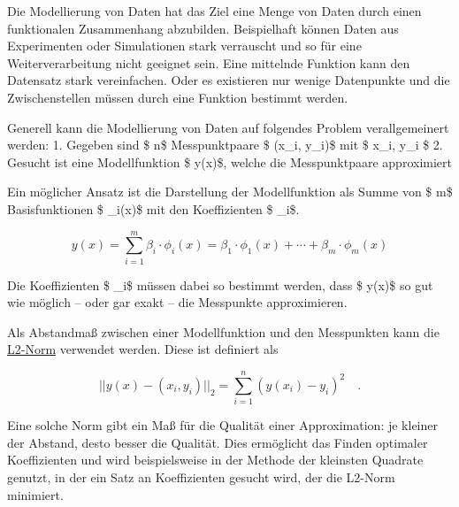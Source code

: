\documentclass[
  letterpaper,
  DIV=11,
  numbers=noendperiod]{scrreprt}
\begin{document}
\begin{tcolorbox}[enhanced jigsaw, colframe=quarto-callout-note-color-frame, coltitle=black, toprule=.15mm, arc=.35mm, title=\textcolor{quarto-callout-note-color}{\faInfo}\hspace{0.5em}{Theorie - Modellierung}, toptitle=1mm, bottomrule=.15mm, leftrule=.75mm, rightrule=.15mm, breakable, bottomtitle=1mm, colbacktitle=quarto-callout-note-color!10!white, opacitybacktitle=0.6, left=2mm, titlerule=0mm, colback=white, opacityback=0]

Die Modellierung von Daten hat das Ziel eine Menge von Daten durch einen
funktionalen Zusammenhang abzubilden. Beispielhaft können Daten aus
Experimenten oder Simulationen stark verrauscht und so für eine
Weiterverarbeitung nicht geeignet sein. Eine mittelnde Funktion kann den
Datensatz stark vereinfachen. Oder es existieren nur wenige Datenpunkte
und die Zwischenstellen müssen durch eine Funktion bestimmt werden.

Generell kann die Modellierung von Daten auf folgendes Problem
verallgemeinert werden: 1. Gegeben sind \$ n\$ Messpunktpaare \$ (x\_i,
y\_i)\$ mit \$ x\_i, y\_i \in {}\$ 2. Gesucht ist eine
Modellfunktion \$ y(x)\$, welche die Messpunktpaare approximiert

Ein möglicher Ansatz ist die Darstellung der Modellfunktion als Summe
von \$ m\$ Basisfunktionen \$ \phi\_i(x)\$ mit den Koeffizienten \$
\beta\_i\$.

\[  y(x) = \sum_{i=1}^{m}\beta_i \cdot \phi_i(x) = \beta_1\cdot \phi_1(x) + \cdots + \beta_m\cdot \phi_m(x) \]

Die Koeffizienten \$ \beta\_i\$ müssen dabei so bestimmt werden, dass \$
y(x)\$ so gut wie möglich -- oder gar exakt -- die Messpunkte
approximieren.

Als Abstandmaß zwischen einer Modellfunktion und den Messpunkten kann
die \href{https://de.wikipedia.org/wiki/Folgenraum\#lp}{L2-Norm}
verwendet werden. Diese ist definiert als

\[  || y(x) - (x_i, y_i) ||_2 = \sum_{i=1}^n \left(y(x_i) - y_i\right)^2 \quad .\]

Eine solche Norm gibt ein Maß für die Qualität einer Approximation: je
kleiner der Abstand, desto besser die Qualität. Dies ermöglicht das
Finden optimaler Koeffizienten und wird beispielsweise in der Methode
der kleinsten Quadrate genutzt, in der ein Satz an Koeffizienten gesucht
wird, der die L2-Norm minimiert.

\end{tcolorbox}
\end{document}
